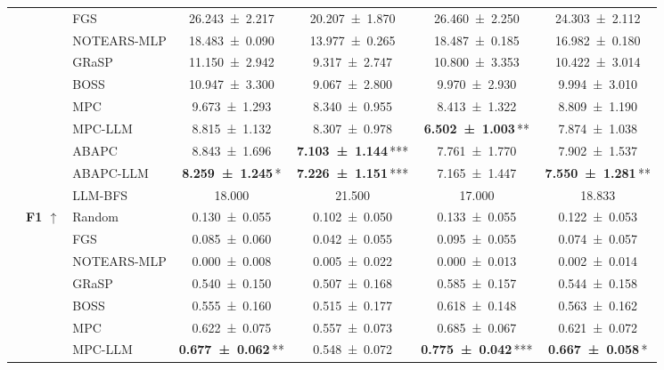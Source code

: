 \begin{table}[t]
\begin{tabular}{@{}cclcccc@{}}
     &  & FGS & \num{26.243 +- 2.217} & \num{20.207 +- 1.870} & \num{26.460 +- 2.250} & \num{24.303 +- 2.112} \\
     &  & NOTEARS-MLP & \num{18.483 +- 0.090} & \num{13.977 +- 0.265} & \num{18.487 +- 0.185} & \num{16.982 +- 0.180} \\
     &  & GRaSP & \num{11.150 +- 2.942} & \num{9.317 +- 2.747} & \num{10.800 +- 3.353} & \num{10.422 +- 3.014} \\
     &  & BOSS & \num{10.947 +- 3.300} & \num{9.067 +- 2.800} & \num{9.970 +- 2.930} & \num{9.994 +- 3.010} \\
     &  & MPC & \num{9.673 +- 1.293} & \num{8.340 +- 0.955} & \num{8.413 +- 1.322} & \num{8.809 +- 1.190} \\
     &  & MPC-LLM & \num{8.815 +- 1.132} & \num{8.307 +- 0.978} & {\bfseries \num{6.502 +- 1.003}}\,\textnormal{**} & \num{7.874 +- 1.038} \\
     &  & ABAPC & \num{8.843 +- 1.696} & {\bfseries \num{7.103 +- 1.144}}\,\textnormal{***} & \num{7.761 +- 1.770} & \num{7.902 +- 1.537} \\
     &  & ABAPC-LLM & {\bfseries \num{8.259 +- 1.245}}\,\textnormal{*} & {\bfseries \num{7.226 +- 1.151}}\,\textnormal{***} & \num{7.165 +- 1.447} & {\bfseries \num{7.550 +- 1.281}}\,\textnormal{**} \\
     &  & LLM-BFS & \num{18.000} & \num{21.500} & \num{17.000} & \num{18.833} \\
    \cmidrule(lr){2-7}
     & \multirow{10}{*}{\textbf{F1 $\uparrow$}} & Random & \num{0.130 +- 0.055} & \num{0.102 +- 0.050} & \num{0.133 +- 0.055} & \num{0.122 +- 0.053} \\
     &  & FGS & \num{0.085 +- 0.060} & \num{0.042 +- 0.055} & \num{0.095 +- 0.055} & \num{0.074 +- 0.057} \\
     &  & NOTEARS-MLP & \num{0.000 +- 0.008} & \num{0.005 +- 0.022} & \num{0.000 +- 0.013} & \num{0.002 +- 0.014} \\
     &  & GRaSP & \num{0.540 +- 0.150} & \num{0.507 +- 0.168} & \num{0.585 +- 0.157} & \num{0.544 +- 0.158} \\
     &  & BOSS & \num{0.555 +- 0.160} & \num{0.515 +- 0.177} & \num{0.618 +- 0.148} & \num{0.563 +- 0.162} \\
     &  & MPC & \num{0.622 +- 0.075} & \num{0.557 +- 0.073} & \num{0.685 +- 0.067} & \num{0.621 +- 0.072} \\
     &  & MPC-LLM & {\bfseries \num{0.677 +- 0.062}}\,\textnormal{**} & \num{0.548 +- 0.072} & {\bfseries \num{0.775 +- 0.042}}\,\textnormal{***} & {\bfseries \num{0.667 +- 0.058}}\,\textnormal{*} \\

\end{tabular}
\end{table}
